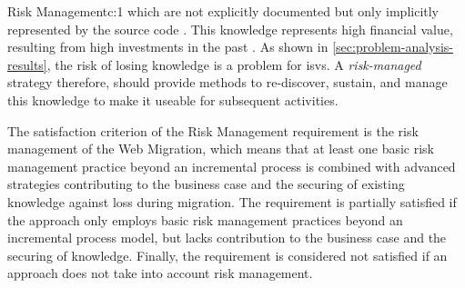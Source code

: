 \begin{thesisstakeholderrequirement}{Risk Management}{c:1}
\autocite{Aversano2001,Distante2006a,Sneed2010SoftwareMigration,Wagner2014} which are not explicitly documented but only implicitly represented by the  source code \autocite{Khadka2014ProfessionalsModernization,Heil2017Survey}. 
This knowledge represents high financial value, resulting from high investments in the past \autocite{Lucia2009METAMORPHOS}.
As shown in \cref{sec:problem-analysis-results}, the risk of losing knowledge is a problem for \glspl{isv}.
A \emph{risk-managed } strategy \autocite{Seacord2003ModernizingLS} therefore, should provide methods to re-discover, sustain, and manage this knowledge to make it useable for subsequent  activities.

The satisfaction criterion of the Risk Management requirement is the \gls{risk management} of the \gls{Web Migration}, which means that at least one basic \gls{risk management} practice beyond an incremental process is combined with advanced strategies contributing to the \gls{business case} and the securing of existing knowledge against loss during migration.
The requirement is partially satisfied if the approach only employs basic \gls{risk management} practices beyond an incremental process model, but lacks contribution to the \gls{business case} and the securing of knowledge.
Finally, the requirement is considered not satisfied if an approach does not take into account \gls{risk management}.
\end{thesisstakeholderrequirement}

